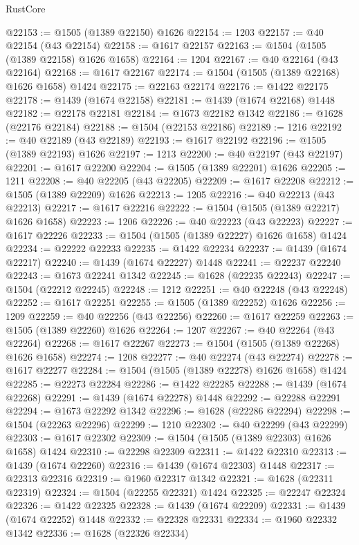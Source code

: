 \begin{lexlean}{RustCore}
\begin{coremodule}
@22153 := @1505 (@1389 @22150) @1626
@22154 := 1203
@22157 := @40 @22154 (@43 @22154)
@22158 := @1617 @22157
@22163 := @1504 (@1505 (@1389 @22158) @1626 @1658)
@22164 := 1204
@22167 := @40 @22164 (@43 @22164)
@22168 := @1617 @22167
@22174 := @1504 (@1505 (@1389 @22168) @1626 @1658) @1424
@22175 := @22163 @22174
@22176 := @1422 @22175
@22178 := @1439 (@1674 @22158)
@22181 := @1439 (@1674 @22168) @1448
@22182 := @22178 @22181
@22184 := @1673 @22182 @1342
@22186 := @1628 (@22176 @22184)
@22188 := @1504 (@22153 @22186)
@22189 := 1216
@22192 := @40 @22189 (@43 @22189)
@22193 := @1617 @22192
@22196 := @1505 (@1389 @22193) @1626
@22197 := 1213
@22200 := @40 @22197 (@43 @22197)
@22201 := @1617 @22200
@22204 := @1505 (@1389 @22201) @1626
@22205 := 1211
@22208 := @40 @22205 (@43 @22205)
@22209 := @1617 @22208
@22212 := @1505 (@1389 @22209) @1626
@22213 := 1205
@22216 := @40 @22213 (@43 @22213)
@22217 := @1617 @22216
@22222 := @1504 (@1505 (@1389 @22217) @1626 @1658)
@22223 := 1206
@22226 := @40 @22223 (@43 @22223)
@22227 := @1617 @22226
@22233 := @1504 (@1505 (@1389 @22227) @1626 @1658) @1424
@22234 := @22222 @22233
@22235 := @1422 @22234
@22237 := @1439 (@1674 @22217)
@22240 := @1439 (@1674 @22227) @1448
@22241 := @22237 @22240
@22243 := @1673 @22241 @1342
@22245 := @1628 (@22235 @22243)
@22247 := @1504 (@22212 @22245)
@22248 := 1212
@22251 := @40 @22248 (@43 @22248)
@22252 := @1617 @22251
@22255 := @1505 (@1389 @22252) @1626
@22256 := 1209
@22259 := @40 @22256 (@43 @22256)
@22260 := @1617 @22259
@22263 := @1505 (@1389 @22260) @1626
@22264 := 1207
@22267 := @40 @22264 (@43 @22264)
@22268 := @1617 @22267
@22273 := @1504 (@1505 (@1389 @22268) @1626 @1658)
@22274 := 1208
@22277 := @40 @22274 (@43 @22274)
@22278 := @1617 @22277
@22284 := @1504 (@1505 (@1389 @22278) @1626 @1658) @1424
@22285 := @22273 @22284
@22286 := @1422 @22285
@22288 := @1439 (@1674 @22268)
@22291 := @1439 (@1674 @22278) @1448
@22292 := @22288 @22291
@22294 := @1673 @22292 @1342
@22296 := @1628 (@22286 @22294)
@22298 := @1504 (@22263 @22296)
@22299 := 1210
@22302 := @40 @22299 (@43 @22299)
@22303 := @1617 @22302
@22309 := @1504 (@1505 (@1389 @22303) @1626 @1658) @1424
@22310 := @22298 @22309
@22311 := @1422 @22310
@22313 := @1439 (@1674 @22260)
@22316 := @1439 (@1674 @22303) @1448
@22317 := @22313 @22316
@22319 := @1960 @22317 @1342
@22321 := @1628 (@22311 @22319)
@22324 := @1504 (@22255 @22321) @1424
@22325 := @22247 @22324
@22326 := @1422 @22325
@22328 := @1439 (@1674 @22209)
@22331 := @1439 (@1674 @22252) @1448
@22332 := @22328 @22331
@22334 := @1960 @22332 @1342
@22336 := @1628 (@22326 @22334)

\end{coremodule}
\end{lexlean}
